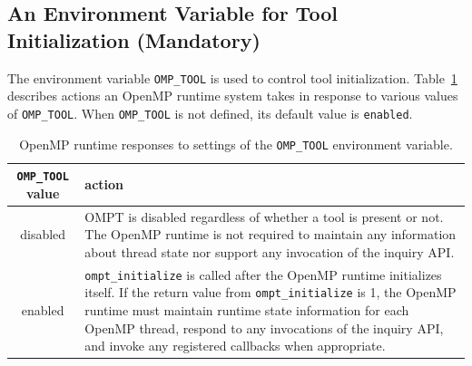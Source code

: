 \documentclass{article}
\begin{document}
\subsection{An Environment Variable for Tool Initialization (Mandatory)}
\label{sec:env}

The environment variable \verb|OMP_TOOL| is used to control tool initialization.
Table~\ref{table:env-var} describes actions an OpenMP runtime system takes in response to various values of  \verb|OMP_TOOL|.
When \verb|OMP_TOOL| is not defined, its default value is \verb|enabled|.


 \begin{table}
\begin{center}
\begin{tabular}{|c|p{4.5in}|}
\hline
\verb|OMP_TOOL| value & action \\\hline
disabled & OMPT is disabled regardless of whether a tool is present or not. The OpenMP runtime is not required to maintain any information about thread state nor support any invocation of the inquiry API. \\\hline
enabled &  \verb|ompt_initialize| is  called after the OpenMP runtime initializes itself. If the return value from \verb|ompt_initialize| is 1, the OpenMP runtime must maintain runtime state information for each OpenMP thread,  respond to any invocations of the inquiry API, and invoke any registered callbacks when appropriate.  \\\hline
\end{tabular}
\end{center}
\caption{OpenMP runtime responses to settings of the {\tt OMP\_TOOL} environment variable.}
\label{table:env-var}
\end{table}
\end{document}
